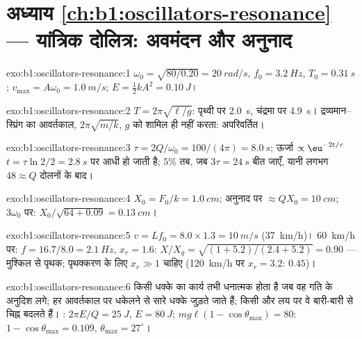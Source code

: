 \section*{अध्याय \ref{ch:b1:oscillators-resonance} --- यांत्रिक दोलित्र: अवमंदन और अनुनाद}

\begin{solution}{exo:b1:oscillators-resonance:1}
$\omega_0 = \sqrt{80/0.20} = \qty{20}{rad/s}$, $f_0 = \qty{3.2}{Hz}$, $T_0 =
\qty{0.31}{s}$; $v_{\max} = A\omega_0 = \qty{1.0}{m/s}$; $E = \tfrac12 kA^2 =
\qty{0.10}{J}$।
\end{solution}

\begin{solution}{exo:b1:oscillators-resonance:2}
$T = 2\pi\sqrt{\ell/g}$: पृथ्वी पर \qty{2.0}{s}, चंद्रमा पर \qty{4.9}{s}।
द्रव्यमान--स्प्रिंग का आवर्तकाल, $2\pi\sqrt{m/k}$, $g$ को शामिल ही नहीं
करता: अपरिवर्तित।
\end{solution}

\begin{solution}{exo:b1:oscillators-resonance:3}
$\tau = 2Q/\omega_0 = 100/(4\pi) = \qty{8.0}{s}$; ऊर्जा $\propto \eu^{-2t/\tau}$
$t = \tau\ln2/2 = \qty{2.8}{s}$ पर आधी हो जाती है; $5\%$ तब, जब $3\tau = \qty{24}{s}$
बीत जाएँ, यानी लगभग $48 \approx Q$ दोलनों के बाद।
\end{solution}

\begin{solution}{exo:b1:oscillators-resonance:4}
$X_0 = F_0/k = \qty{1.0}{cm}$; अनुनाद पर $\approx QX_0 = \qty{10}{cm}$;
$3\omega_0$ पर: $X_0/\sqrt{64 + 0.09} = \qty{0.13}{cm}$।
\end{solution}

\begin{solution}{exo:b1:oscillators-resonance:5}
$v = Lf_0 = 8.0 \times 1.3 = \qty{10}{m/s}$ (\qty{37}{km/h})।
\qty{60}{km/h} पर: $f = 16.7/8.0 = \qty{2.1}{Hz}$, $x_r = 1.6$: $X/X_g =
\sqrt{(1 + 5.2)/(2.4 + 5.2)} = 0.90$ --- मुश्किल से पृथक; पृथक्करण के लिए
$x_r \gg 1$ चाहिए (\qty{120}{km/h} पर $x_r = 3.2$: $0.45$)।
\end{solution}

\begin{solution}{exo:b1:oscillators-resonance:6}
किसी धक्के का कार्य तभी धनात्मक होता है जब वह गति के अनुदिश लगे; हर
आवर्तकाल पर धकेलने से सारे धक्के जुड़ते जाते हैं; किसी और लय पर वे
बारी-बारी से चिह्न बदलते हैं। : $2\pi E/Q = \qty{25}{J}$, $E = \qty{80}{J}$;
$mg\ell(1 - \cos\theta_{\max}) = 80$: $1 - \cos\theta_{\max} = 0.109$,
$\theta_{\max} = 27^\circ$।
\end{solution}

